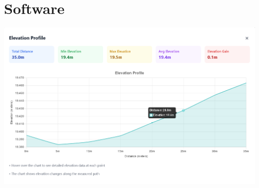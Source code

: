 %
%
%
%
%
%
%

\chapter{Software} \label{ch:software}

\includegraphics[scale=0.3]{figures/elevation_profile.png}